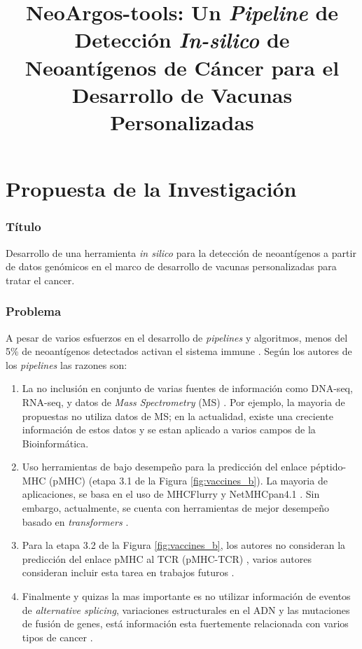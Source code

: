 \documentclass[a4paper,11pt]{article}
\title{ 
	
	NeoArgos-tools: Un \textit{Pipeline} de Detección \textit{In-silico} de Neoantígenos de Cáncer para el Desarrollo de Vacunas Personalizadas
}
\author{}
\date{}
\begin{document}
	

	
	
	
	
	
	
	

\part*{Propuesta de la Investigación}

\section{Título}
Desarrollo de una herramienta \textit{in silico} para la detección de neoantígenos a partir de datos genómicos en el marco de desarrollo de vacunas personalizadas para tratar el cancer.

\section{Problema}

A pesar de varios esfuerzos en el desarrollo de \textit{pipelines} y algoritmos, menos del 5\% de neoantígenos detectados activan el sistema immune \citep{de2020neoantigen, mill2022neoms, bulik2019deep, bassani2015mass, yadav2014predicting}. Según los autores de los \textit{pipelines} las razones son: 

\begin{enumerate}
	\item La no inclusión en conjunto de varias fuentes de información como DNA-seq, RNA-seq, y datos de \textit{Mass Spectrometry} (MS) \citep{kim2018neopepsee}. Por ejemplo, la mayoria de  propuestas no utiliza datos de MS; en la actualidad, existe una creciente información de estos datos y se estan aplicado a varios campos de la Bioinformática.
	\item  Uso herramientas de bajo desempeño para la predicción del enlace péptido-MHC (pMHC) (etapa 3.1  de la Figura \ref{fig:vaccines_b}). La mayoria de aplicaciones, se basa en el uso de MHCFlurry \citep{o2020mhcflurry} y NetMHCpan4.1 \citep{reynisson2020netmhcpan}. Sin embargo, actualmente, se cuenta con herramientas de mejor desempeño basado en \textit{transformers} \citep{arceda2023neoantigen}.
	\item Para la etapa 3.2 de la Figura \ref{fig:vaccines_b}, los autores no consideran  la predicción del enlace pMHC al TCR (pMHC-TCR) , varios autores consideran incluir esta tarea en trabajos futuros  \citep{rubinsteyn2018computational}.
	\item Finalmente y quizas la mas importante es no utilizar información de eventos de \textit{alternative splicing}, variaciones estructurales en el ADN y las mutaciones de fusión de genes, está información esta fuertemente relacionada con varios tipos de cancer \citep{wood2020neoepiscope}.
\end{enumerate}
\end{document}
